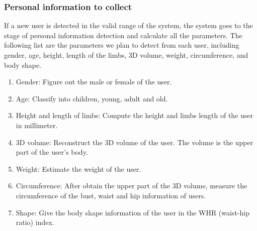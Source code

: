 \subsubsection{Personal information to collect}
If a new user is detected in the valid range of the system, the system goes to the stage of personal information detection and calculate all the parameters. The following list are the parameters we plan to detect from each user, including gender, age, height, length of the limbs, 3D volume, weight, circumference, and body shape.
\begin{enumerate} [label=\arabic*.]
	\item  Gender: Figure out the male or female of the user.
	\item Age: Classify into children, young, adult and old.
	\item  Height and length of limbs: Compute the height and limbs length of the user in millimeter.
	\item 3D volume: Reconstruct the 3D volume of the user. The volume is the upper part of the user's body.
	\item  Weight: Estimate the weight of the user.
	\item  Circumference: After obtain the upper part of the 3D volume, measure the circumference of the bust, waist and hip information of users.
	\item  Shape: Give the body shape information of the user in the WHR (waist-hip ratio) index.
\end{enumerate}


